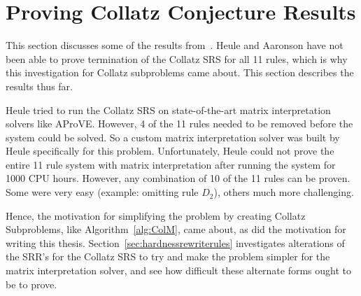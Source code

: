 \chapter{Proving Collatz Conjecture Results} \label{sec:provingCollatzresults}
This section discusses some of the results from~\cite{HeuleAaronson}. Heule and Aaronson have not been able to prove termination of the Collatz SRS for all 11 rules, which is why this investigation for Collatz subproblems came about. This section describes the results thus far. \par
Heule tried to run the Collatz SRS on state-of-the-art matrix interpretation solvers like AProVE. However, 4 of the 11 rules needed to be removed before the system could be solved. So a custom matrix interpretation solver was built by Heule specifically for this problem. 
Unfortunately, Heule could not prove the entire 11 rule system with matrix interpretation after running the system for 1000 CPU hours. However, any combination of 10 of the 11 rules can be proven. Some were very easy (example: omitting rule $D_2$), others much more challenging.\par
Hence, the motivation for simplifying the problem by creating Collatz Subproblems, like Algorithm~\ref{alg:ColM}, came about, as did the motivation for writing this thesis. Section~\ref{sec:hardnessrewriterules} investigates alterations of the SRR's for the Collatz SRS to try and make the problem simpler for the matrix interpretation solver, and see how difficult these alternate forms ought to be to prove.